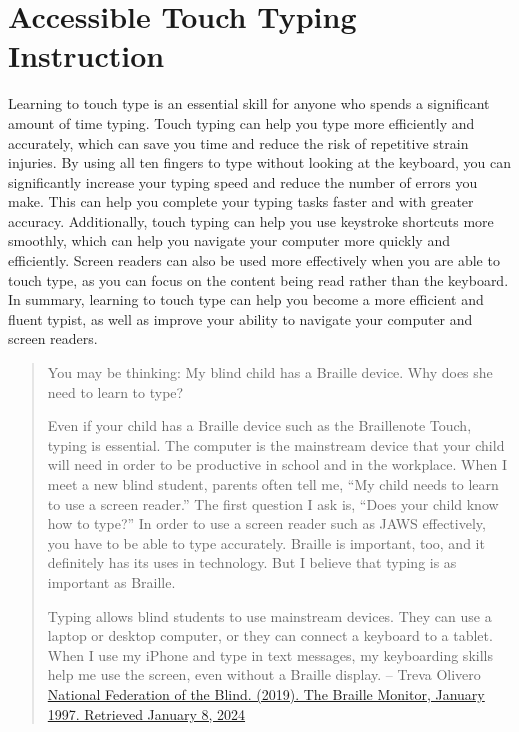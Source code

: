 \pagebreak\hypertarget{appx5}{}\section[Accessible Touch Typing Instruction]{Accessible Touch Typing Instruction}\label{appx5}

Learning to touch type is an essential skill for anyone who spends a significant amount of time typing. Touch typing can help you type more efficiently and accurately, which can save you time and reduce the risk of repetitive strain injuries. By using all ten fingers to type without looking at the keyboard, you can significantly increase your typing speed and reduce the number of errors you make. This can help you complete your typing tasks faster and with greater accuracy. Additionally, touch typing can help you use keystroke shortcuts more smoothly, which can help you navigate your computer more quickly and efficiently. Screen readers can also be used more effectively when you are able to touch type, as you can focus on the content being read rather than the keyboard. In summary, learning to touch type can help you become a more efficient and fluent typist, as well as improve your ability to navigate your computer and screen readers. 

\begin{leftbar}
 \begin{quote}
 You may be thinking: My blind child has a Braille device. Why does she need to learn to type?
 
 Even if your child has a Braille device such as the Braillenote Touch, typing is essential. The computer is the mainstream device that your child will need in order to be productive in school and in the workplace. When I meet a new blind student, parents often tell me, ``My child needs to learn to use a screen reader.'' The first question I ask is, ``Does your child know how to type?'' In order to use a screen reader such as JAWS effectively, you have to be able to type accurately. Braille is important, too, and it definitely has its uses in technology. But I believe that typing is as important as Braille.
 
 Typing allows blind students to use mainstream devices. They can use a laptop or desktop computer, or they can connect a keyboard to a tablet. When I use my iPhone and type in text messages, my keyboarding skills help me use the screen, even without a Braille display.
 \break -- Treva Olivero \break\href{https://nfb.org/images/nfb/publications/fr/fr40/1/fr400103.htm}{National Federation of the Blind. (2019). The Braille Monitor, January 1997. Retrieved January 8, 2024}
 \end{quote}
\end{leftbar}

